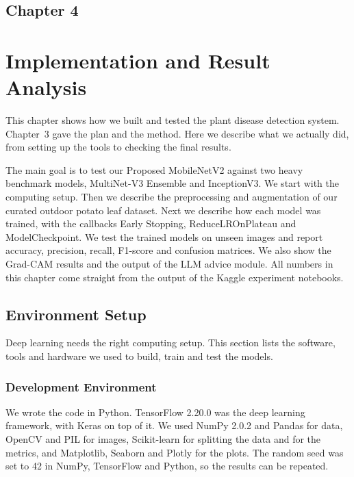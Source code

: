 \begin{center}
    \section*{\fontsize{20}{20}\selectfont Chapter 4}
\end{center}
\vspace{10mm}

\section{Implementation and Result Analysis}

This chapter shows how we built and tested the plant disease detection system. Chapter~3 gave the plan and the method. Here we describe what we actually did, from setting up the tools to checking the final results.

The main goal is to test our Proposed MobileNetV2 against two heavy benchmark models, MultiNet-V3 Ensemble and InceptionV3. We start with the computing setup. Then we describe the preprocessing and augmentation of our curated outdoor potato leaf dataset. Next we describe how each model was trained, with the callbacks Early Stopping, ReduceLROnPlateau and ModelCheckpoint. We test the trained models on unseen images and report accuracy, precision, recall, F1-score and confusion matrices. We also show the Grad-CAM results and the output of the LLM advice module. All numbers in this chapter come straight from the output of the Kaggle experiment notebooks.

\subsection{Environment Setup}
Deep learning needs the right computing setup. This section lists the software, tools and hardware we used to build, train and test the models.

\subsubsection{Development Environment}
We wrote the code in Python. TensorFlow 2.20.0 was the deep learning framework, with Keras on top of it. We used NumPy 2.0.2 and Pandas for data, OpenCV and PIL for images, Scikit-learn for splitting the data and for the metrics, and Matplotlib, Seaborn and Plotly for the plots. The random seed was set to 42 in NumPy, TensorFlow and Python, so the results can be repeated.

